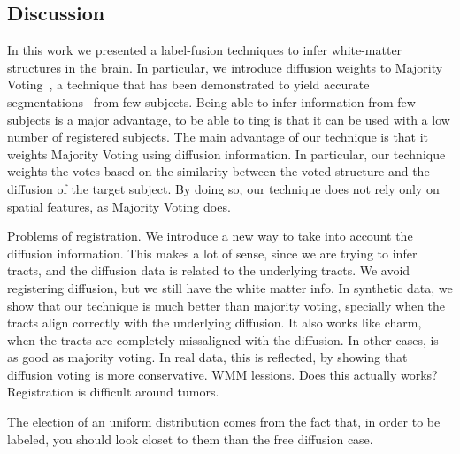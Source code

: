 
\subsection{Discussion}
In this work we presented a label-fusion techniques to infer white-matter
structures in the brain. In particular, we introduce diffusion weights to Majority
Voting~\cite{Xu1992}, a technique that has been demonstrated to yield accurate
segmentations~\cite{Asman2013} from few subjects. Being able to infer information
from few subjects is a major advantage,  to be able to ting is that it can be used with a low number of
registered subjects. The main advantage of our technique is
that it weights Majority Voting using diffusion information. In particular, our technique
weights the votes based on the similarity between the voted structure and the
diffusion of the target subject. By doing so, our technique does not rely only
on spatial features, as Majority Voting does.



Problems of registration.
We introduce a new way to take into account the diffusion information.
This makes a lot of sense, since we are trying to infer tracts, and the 
diffusion data is related to the underlying tracts.
We avoid registering diffusion, but we still have the white matter info.
In synthetic data, we show that our technique is much better than
majority voting, specially when the tracts align correctly with the
underlying diffusion. It also works like charm, when the tracts are completely
missaligned with the diffusion. In other cases, is as good as majority voting.
In real data, this is reflected, by showing that diffusion voting is more
conservative. WMM lessions.
Does this actually works? Registration is difficult around tumors.


The election of an uniform distribution comes from the fact that, in order to
be labeled, you should look closet to them than the free diffusion case.


